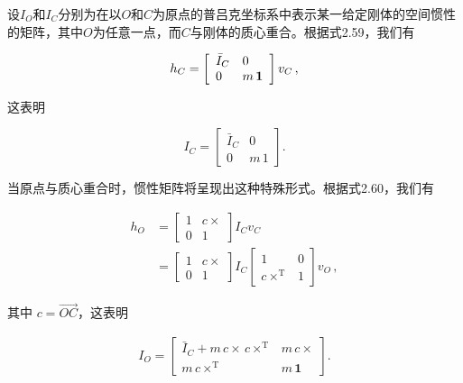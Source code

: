 \documentclass[10pt,a4paper]{book}
\theoremstyle{thmstyle} %
\theoremstyle{defstyle} %
\theoremstyle{prostyle} %
\begin{document}
设$I_{O}$和$I_{C}$分别为在以$O$和$C$为原点的普吕克坐标系中表示某一给定刚体的空间惯性的矩阵，其中$O$为任意一点，而$C$与刚体的质心重合。根据式2.59，我们有



$$
\begin{array}{r} { h _ { C } = \left[ \begin{array}{ll} { \bar { I } _ { C } } & { 0 } \\{ 0 } & { m \, { \bf 1 } } \end{array} \right] v _ { C } \, , } \end{array}
$$



这表明



$$
I _ { C } = \left[ \begin{array}{ll} { { \bar { I } _ { C } } } & { { 0 } } \\{ { 0 } } & { { m \, 1 } } \end{array} \right] .
$$



当原点与质心重合时，惯性矩阵将呈现出这种特殊形式。根据式2.60，我们有



$$
\begin{array}{rl} { h _ { O } } & { = \left[ \begin{array}{ll} { 1 } & { c \times } \\{ 0 } & { 1 } \end{array} \right] I _ { C } v _ { C } } \\& { = \left[ \begin{array}{ll} { 1 } & { c \times } \\{ 0 } & { 1 } \end{array} \right] I _ { C } \left[ \begin{array}{ll} { 1 } & { 0 } \\{ c \times ^{\mathrm { T} } } & { 1 } \end{array} \right] v _ { O } \, , } \end{array}
$$



其中 $c=\overrightarrow{OC}$，这表明



$$
\begin{array}{r} { I _ { O } = \left[ \begin{array}{ll} { \bar { I } _ { C } + m \, c \times \, c \times ^{\mathrm { T} } } & { m \, c \times } \\{ m \, c \times ^{\mathrm { T} } } & { m \, \mathbf { 1 } } \end{array} \right] . } \end{array}
$$
\end{document}
